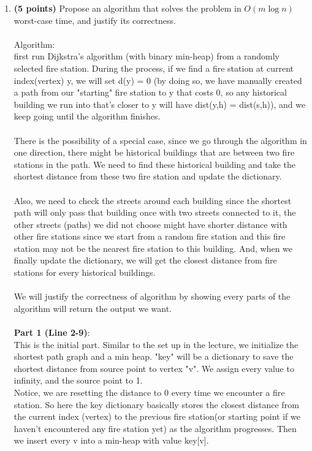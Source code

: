 \documentclass{assignment-373}
\begin{document}
\begin{enumerate}
\item \label{item:algo} \textbf{(5 points)} Propose an algorithm that
  solves the problem in $O(m \log n)$ worst-case time, and justify its
  correctness.
  \\\\
  Algorithm:\\
  \phantom{=} \phantom{=} first run Dijkstra's algorithm (with binary min-heap) from a randomly selected fire station. During the process, if we find a fire station at current index(vertex) y, we will set d(y) = 0 (by doing so, we have manually created a path from our "starting" fire station to y that costs 0, so any historical building we run into that's closer to y will have dist(y,h) = dist(s,h)), and we keep going until the algorithm finishes.\\
  \\
  \phantom{=} \phantom{=} There is the possibility of a special case, since we go through the algorithm in one direction, there might be historical buildings that are between two fire stations in the path. We need to find these historical building and take the shortest distance from these two fire station and update the dictionary.\\
  \\
  \phantom{=} \phantom{=} Also, we need to check the streets around each building since the shortest path will only pass that building once with two streets connected to it, the other streets (paths) we did not choose might have shorter distance with other fire stations since we start from a random fire station and this fire station may not be the nearest fire station to this building. And, when we finally update the dictionary, we will get the closest distance from fire stations for every historical buildings.\\
  \\
  \phantom{=} \phantom{=} We will justify the correctness of algorithm by showing every parts of the algorithm will return the output we want.\\\\
  {\bf Part 1 (Line 2-9)}:\\
  \phantom{=} \phantom{=} This is the initial part. Similar to the set up in the lecture, we initialize the shortest path graph and a min heap. "key" will be a dictionary to save the shortest distance from source point to vertex "v". We assign every value to infinity, and the source point to 1.\\ 
  \phantom{=} \phantom{=} Notice, we are resetting the distance to 0 every time we encounter a fire station. So here the key dictionary basically stores the closest distance from the current index (vertex) to the previous fire station(or starting point if we haven't encountered any fire station yet) as the algorithm progresses. Then we insert every v into a min-heap with value key[v].\\\\

\end{enumerate}
\end{document}
